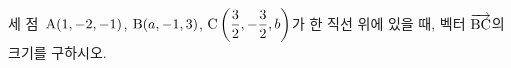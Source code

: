 세 점~$\mathrm{A}(1{,}\mkern3mu\mathopen{}-2{,}\mkern3mu\mathopen{}-1)$, $\mathrm{B}(a{,}\mkern3mu\mathopen{}-1{,}\mkern3mu\mathopen{}3)$, $\mathrm{C}\left(\dfrac{3}{2}{,}\mkern3mu\mathopen{}-\dfrac{3}{2}{,}\mkern3mu\mathopen{}b\right)$가 한 직선 위에 있을 때, 벡터 $\overrightarrow{\mathrm{BC}}$의 크기를 구하시오.
